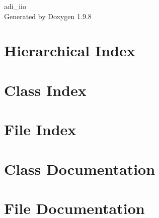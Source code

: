 \documentclass[twoside]{book}
\newcommand{\+}{\discretionary{\mbox{\scriptsize$\hookleftarrow$}}{}{}}
\newcommand{\clearemptydoublepage}{%
    \newpage{\pagestyle{empty}\cleardoublepage}%
  }
\begin{document}
  \raggedbottom
    \hypersetup{pageanchor=false,
                bookmarksnumbered=true,
                pdfencoding=unicode
               }
  \begin{titlepage}
  \vspace*{7cm}
  \begin{center}%
  {\Large adi\+\_\+iio}\\
  \vspace*{1cm}
  {\large Generated by Doxygen 1.9.8}\\
  \end{center}
  \end{titlepage}
  \clearemptydoublepage
  \tableofcontents
  \clearemptydoublepage
  \hypersetup{pageanchor=true}
\chapter{Hierarchical Index}

\chapter{Class Index}

\chapter{File Index}

\chapter{Class Documentation}









\chapter{File Documentation}




  \backmatter
  \newpage
  \clearemptydoublepage
  \printindex
\end{document}
